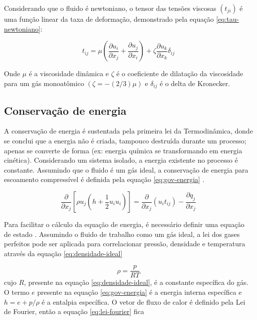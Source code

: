 Considerando que o fluido é newtoniano, o tensor das tensões viscosas \(\left(t_{ji}\right)\) é uma função linear da taxa de deformação, demonstrado pela equação \ref{eq:tau-newtoniano}:

\begin{equation}
    \label{eq:tau-newtoniano}
    t_{ij} = \mu \left(\frac{\partial u_i}{\partial x_j} + \frac{\partial u_j}{\partial x_i} \right) + \zeta\frac{\partial u_k}{\partial x_k}\delta_{ij}
\end{equation}

Onde \(\mu\) é a viscosidade dinâmica e \(\zeta\) é o coeficiente de dilatação da viscosidade para um gás monoatômico \(\left(\zeta = -(2/3)\mu\right)\) e \(\delta_{ij}\) é o delta de Kronecker. 

\subsection{Conservação de energia}

A conservação de energia é sustentada pela primeira lei da Termodinâmica, donde se conclui que a energia não é criada, tampouco destruída durante um processo; apenas se converte de forma (ex: energia química se transformando em energia cinética). Considerando um sistema isolado, a energia existente no processo é constante. Assumindo que o fluido é um gás ideal, a conservação de energia para escoamento compressível é definida pela equação \ref{eq:gov-energia} \cite{Moukalled2015, Wilcox2006}.

\begin{equation}
    \label{eq:gov-energia}
   \frac{\partial}{\partial x_j}\left[\rho u_j\left(h + \frac{1}{2}u_i u_i \right)\right] = \frac{\partial}{\partial x_j}\left(u_i t_{ij}\right) - \frac{\partial q_j}{\partial x_j}
\end{equation}

Para facilitar o cálculo da equação de energia, é necessário definir uma equação de estado \cite{Wilcox2006}. Assumindo o fluido de trabalho como um gás ideal, a lei dos gases perfeitos pode ser aplicada para correlacionar pressão, densidade e temperatura através da equação \ref{eq:densidade-ideal}

\begin{equation}
    \label{eq:densidade-ideal}
    \rho = \frac{p}{RT}
\end{equation}
%
cujo \(R\), presente na equação \ref{eq:densidade-ideal}, é a constante específica do gás. O termo \(e\) presente na equação \ref{eq:gov-energia} é a energia interna específica e \(h = e + p/\rho\) é a entalpia específica. O vetor de fluxo de calor é definido pela Lei de Fourier, então a equação \ref{eq:lei-fourier} fica


